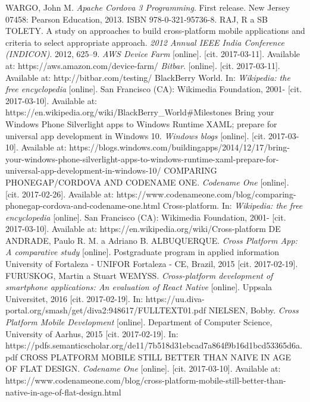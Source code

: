 \documentclass[english,master,public,dept460,male,cpdeclaration,oneside]{diploma}
\begin{document}
\begin{thebibliography}{99}	
	 WARGO, John M. \textit{Apache Cordova 3 Programming}. First release. New Jersey 07458: Pearson Education, 2013. ISBN 978-0-321-95736-8.
	 RAJ, R a SB TOLETY. A study on approaches to build cross-platform mobile applications and criteria to select appropriate approach. \textit{2012 Annual IEEE India Conference (INDICON)}. 2012, 625–9.
	 \textit{AWS Device Farm} [online]. [cit. 2017-03-11]. Available at: https://aws.amazon.com/device-farm/	
	 \textit{Bitbar}. [online]. [cit. 2017-03-11]. Available at: http://bitbar.com/testing/	
	 BlackBerry World. In: \textit{Wikipedia: the free encyclopedia} [online]. San Francisco (CA): Wikimedia Foundation, 2001- [cit. 2017-03-10]. Available at: https://en.wikipedia.org/wiki/BlackBerry\_World\#Milestones
	 Bring your Windows Phone Silverlight apps to Windows Runtime XAML; prepare for universal app development in Windows 10. \textit{Windows blogs} [online]. [cit. 2017-03-10]. Available at: https://blogs.windows.com/buildingapps/2014/12/17/bring-your-windows-phone-silverlight-apps-to-windows-runtime-xaml-prepare-for-universal-app-development-in-windows-10/
	 COMPARING PHONEGAP/CORDOVA AND CODENAME ONE. \textit{Codename One} [online]. [cit. 2017-02-26]. Available at: https://www.codenameone.com/blog/comparing-phonegap-cordova-and-codename-one.html
	 Cross-platform. In: \textit{Wikipedia: the free encyclopedia} [online]. San Francisco (CA): Wikimedia Foundation, 2001- [cit. 2017-03-10]. Available at: https://en.wikipedia.org/wiki/Cross-platform
	DE ANDRADE, Paulo R. M. a Adriano B. ALBUQUERQUE. \textit{Cross Platform App: A comparative study} [online]. Postgraduate program in applied information University of Fortaleza - UNIFOR Fortaleza - CE, Brazil, 2015 [cit. 2017-02-19].
	 FURUSKOG, Martin a Stuart WEMYSS. \textit{Cross-platform development of smartphone applications: An evaluation of React Native} [online]. Uppsala Universitet, 2016 [cit. 2017-02-19]. In: https://uu.diva-portal.org/smash/get/diva2:948617/FULLTEXT01.pdf
	NIELSEN, Bobby. \textit{Cross Platform Mobile Development} [online]. Department of Computer Science, University of Aarhus, 2015 [cit. 2017-02-19]. In: https://pdfs.semanticscholar.org/de11/7b518d31ebcad7a864f9b16d1bcd53365d6a.pdf
	 CROSS PLATFORM MOBILE STILL BETTER THAN NAIVE IN AGE OF FLAT DESIGN. \textit{Codename One} [online]. [cit. 2017-03-10]. Available at: https://www.codenameone.com/blog/cross-platform-mobile-still-better-than-native-in-age-of-flat-design.html

\end{thebibliography}
\end{document}
